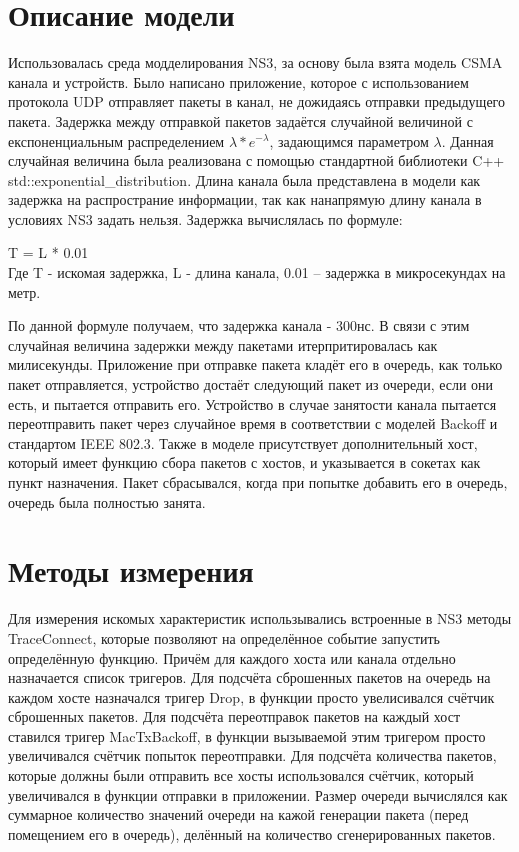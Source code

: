 \documentclass[a4peper, 12pt, titlepage, finall]{extreport}
\begin{document}
    \section{Описание модели}
        Использовалась среда модделирования NS3, за основу была взята модель CSMA канала и устройств.
        Было написано приложение, которое с использованием протокола UDP отправляет пакеты в канал, не дожидаясь отправки предыдущего пакета.
        Задержка между отправкой пакетов задаётся случайной величиной с експоненциальным распределением {\ttfamily$\lambda*e^{-\lambda}$}, 
        задающимся параметром {\ttfamily$\lambda$}. Данная случайная величина была реализована с помощью стандартной библиотеки C++\\
        {\ttfamily std::exponential\_distribution}. Длина канала была представлена в модели как задержка на распространие информации,
        так как нанапрямую длину канала в условиях NS3 задать нельзя. Задержка вычислялась по формуле:
        \begin{center}
            {\ttfamily T = L * 0.01}\\
            Где T - искомая задержка, L - длина канала, 0.01 -- задержка в микросекундах на метр.
        \end{center}
        По данной формуле получаем, что задержка канала - 300нс. В связи с этим случайная величина задержки между пакетами итерпритировалась как 
        милисекунды. Приложение при отправке пакета кладёт его в очередь, как только пакет отправляется,
        устройство достаёт следующий пакет из очереди, если они есть, и пытается отправить его. Устройство в случае занятости канала пытается переотправить
        пакет через случайное время в соответствии с моделей Backoff и стандартом {\ttfamily IEEE 802.3}. Также в моделе присутствует дополнительный хост,
        который имеет функцию сбора пакетов с хостов, и указывается в сокетах как пункт назначения. Пакет сбрасывался, когда при попытке добавить его в очередь, очередь была полностью занята.
    \section{Методы измерения}
        Для измерения искомых характеристик использывались встроенные в NS3 методы {\ttfamily TraceConnect}, которые позволяют на определённое 
        событие запустить определённую функцию. Причём для каждого хоста или канала отдельно назначается список тригеров. Для подсчёта сброшенных пакетов
        на очередь на каждом хосте назначался тригер {\ttfamily Drop}, в функции просто увелисивался счётчик сброшенных пакетов. Для подсчёта
        переотправок пакетов на каждый хост ставился тригер {\ttfamily MacTxBackoff}, в функции вызываемой этим тригером просто увеличивался счётчик попыток переотправки.
        Для подсчёта количества пакетов, которые должны были отправить все хосты использовался счётчик, который увеличивался в функции отправки в приложении.
        Размер очереди вычислялся как суммарное количество значений очереди на кажой генерации пакета (перед помещением его в очередь), 
        делённый на количество сгенерированных пакетов.
    \newpage
\end{document}
